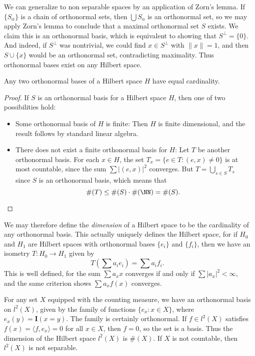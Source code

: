 We can generalize to non separable spaces by an application of Zorn's lemma. If $\{ S_\alpha \}$ is a chain of orthonormal sets, then $\bigcup S_\alpha$ is an orthonormal set, so we may apply Zorn's lemma to conclude that a maximal orthonormal set $S$ exists. We claim this is an orthonormal basis, which is equivalent to showing that $S^\perp = \{ 0 \}$. And indeed, if $S^\perp$ was nontrivial, we could find $x \in S^\perp$ with $\| x \| = 1$, and then $S \cup \{ x \}$ would be an orthonormal set, contradicting maximality. Thus orthonormal bases exist on any Hilbert space.

\begin{theorem}
    Any two orthonormal bases of a Hilbert space $H$ have equal cardinality.
\end{theorem}
\begin{proof}
    If $S$ is an orthonormal basis for a Hilbert space $H$, then one of two possibilities hold:
    \begin{itemize}
        \item Some orthonormal basis of $H$ is finite: Then $H$ is finite dimensional, and the result follows by standard linear algebra.
        \item There does not exist a finite orthonormal basis for $H$: Let $T$ be another orthonormal basis. For each $x \in H$, the set $T_x = \{ e \in T: (e,x) \neq 0 \}$ is at most countable, since the sum $\sum |(e,x)|^2$ converges. But $T = \bigcup_{s \in S} T_s$ since $S$ is an orthonormal basis, which means that
        \[ \#(T) \leq \#(S) \cdot \#(\NN) = \#(S). \qedhere \]
    \end{itemize}
\end{proof}

We may therefore define the \emph{dimension} of a Hilbert space to be the cardinality of any orthonormal basis. This actually uniquely defines the Hilbert space, for if $H_0$ and $H_1$ are Hilbert spaces with orthonormal bases $\{ e_i \}$ and $\{ f_i \}$, then we have an isometry $T: H_0 \to H_1$ given by
%
\[ T(\sum a_i e_i) = \sum a_i f_i. \]
%
This is well defined, for the sum $\sum a_x x$ converges if and only if $\sum |a_x|^2 < \infty$, and the same criterion shows $\sum a_x f(x)$ converges.

\begin{example}
    For any set $X$ equipped with the counting measure, we have an orthonormal basis on $l^2(X)$, given by the family of functions $\{ e_x : x \in X \}$, where $e_x(y) = \mathbf{I}(x = y)$. The family is certainly orthonormal. If $f \in l^2(X)$ satisfies $f(x) = \langle f, e_x \rangle = 0$ for all $x \in X$, then $f = 0$, so the set is a basis. Thus the dimension of the Hilbert space $l^2(X)$ is $\#(X)$. If $X$ is not countable, then $l^2(X)$ is not separable.
\end{example}

